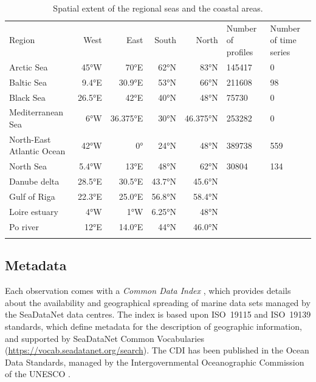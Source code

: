 \documentclass[essd,manuscript]{copernicus}
\begin{document}
\begin{table}[h!]
\caption{Spatial extent of the regional seas and the coastal areas.\label{tab:regions}}
\begin{tabular}{lrrrrll}
\tophline
Region	 					& West		& East		& South 		& North 		& Number of profiles	& Number of time series\\ 
\middlehline	
Arctic Sea 					& 45°W 		& 70°E		& 62°N		& 83°N		& 145417		& 0		\\
Baltic Sea					& 9.4°E		& 30.9°E		& 53°N		& 66°N		& 211608		& 98		\\
Black Sea					& 26.5°E 	& 42°E		& 40°N		& 48°N	 	& 75730		& 0		\\
Mediterranean Sea			& 6°W		& 36.375°E	& 30°N		& 46.375°N	& 253282		& 0		\\
North-East Atlantic Ocean 	& 42°W		& 0° 		& 24°N		& 48°N		& 389738		& 559	\\
North Sea 					& 5.4°W 		& 13°E		& 48°N		& 62°N		& 30804		& 134	\\
\middlehline	
Danube delta				& 28.5°E		& 30.5°E		& 43.7°N 	& 45.6°N		&			& \\
Gulf of Riga 				& 22.3°E 	& 25.0°E 	& 56.8°N 	& 58.4°N		&			& \\
Loire estuary				& 4°W		& 1°W 		& 6.25°N		& 48°N		&			& \\
Po river					 & 12°E		& 14.0°E		& 44°N		& 46.0°N		&			& \\
\bottomhline
\end{tabular}
\end{table}

\subsection{Metadata\label{sec:metadata}}

Each observation comes with a \textit{Common Data Index} \citep[CDI,][]{Schaap2021,Schaap2022}, which provides details about the availability and geographical spreading of marine data sets managed by the SeaDataNet data centres. The index is based upon ISO~19115 and ISO~19139 standards, which define metadata for the description of geographic information, and supported by SeaDataNet Common Vocabularies (\url{https://vocab.seadatanet.org/search}). The CDI has been published in the Ocean Data Standards, managed by the Intergovernmental Oceanographic Commission of the UNESCO \citet{Schaap2021}.
\end{document}
